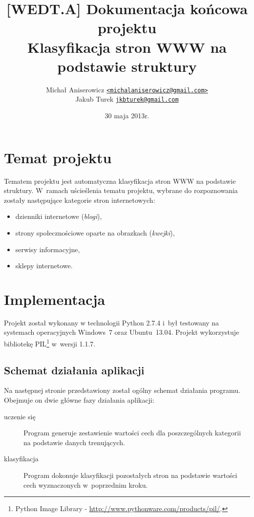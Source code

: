 \documentclass[a4paper,11pt]{article}
\author{Michał Aniserowicz \href{mailto:michalaniserowicz@gmail.com}{{\small \nolinkurl{<michalaniserowicz@gmail.com>}}} \\ Jakub Turek \href{mailto:jkbturek@gmail.com}{{\small \nolinkurl{jkbturek@gmail.com}}}}
\title{{\Large [WEDT.A] Dokumentacja końcowa projektu} \\ Klasyfikacja stron WWW na podstawie struktury}
\date{30 maja 2013r.}
\begin{document}
\maketitle

\section{Temat projektu}

Tematem projektu jest automatyczna klasyfikacja stron WWW na podstawie struktury. W~ramach uścieślenia tematu projektu, wybrane do rozpoznowania zostały następujące kategorie stron internetowych:

\begin{itemize}
 \item dzienniki internetowe (\emph{blogi}),
 \item strony społecznościowe oparte na obrazkach (\emph{kwejki}),
 \item serwisy informacyjne,
 \item sklepy internetowe.
\end{itemize}

\section{Implementacja}

Projekt został wykonany w technologii Python 2.7.4 i~był testowany na systemach operacyjnych Windows~7 oraz Ubuntu~13.04. Projekt wykorzystuje bibliotekę PIL\footnote{Python Image Library - \href{http://www.pythonware.com/products/pil/}{http://www.pythonware.com/products/pil/}.} w~wersji 1.1.7.

\subsection{Schemat działania aplikacji}

Na następnej stronie przedstawiony został ogólny schemat działania programu. Obejmuje on dwie główne fazy działania aplikacji:

\begin{description}
    \item[uczenie się] Program generuje zestawienie wartości cech dla poszczególnych kategorii na podstawie danych trenujących.
    \item[klasyfikacja] Program dokonuje klasyfikacji pozostałych stron na podstawie wartości cech wyznaczonych w~poprzednim kroku.
\end{description}
\end{document}
